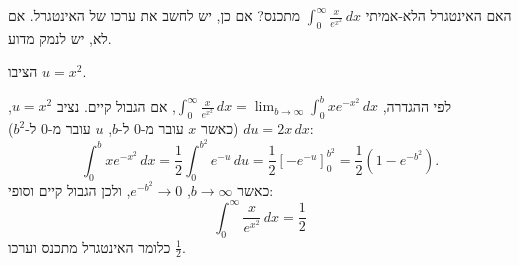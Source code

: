 
\begin{question}
האם האינטגרל הלא-אמיתי $\displaystyle\int_0^\infty\frac{x}{e^{x^2}}\,dx$ מתכנס? אם כן, יש לחשב את ערכו של האינטגרל. אם לא, יש לנמק מדוע.
\end{question}

\begin{hint}
הציבו $u=x^2$.
\end{hint}

\begin{solution}
לפי ההגדרה, $\int_0^\infty\frac{x}{e^{x^2}}\,dx=\lim_{b\to\infty}\int_0^b xe^{-x^2}\,dx$, אם הגבול קיים. נציב $u=x^2$, $du=2x\,dx$ (כאשר $x$ עובר מ-$0$ ל-$b$, $u$ עובר מ-$0$ ל-$b^2$):
\[ \int_0^b xe^{-x^2}\,dx=\frac12\int_0^{b^2}e^{-u}\,du=\frac12\left[-e^{-u}\right]_0^{b^2}=\frac12\left(1-e^{-b^2}\right). \]
כאשר $b\to\infty$, $e^{-b^2}\to0$, ולכן הגבול קיים וסופי:
\[ \boxed{\int_0^\infty\frac{x}{e^{x^2}}\,dx=\frac12} \]
כלומר האינטגרל מתכנס וערכו $\frac12$.
\end{solution}
